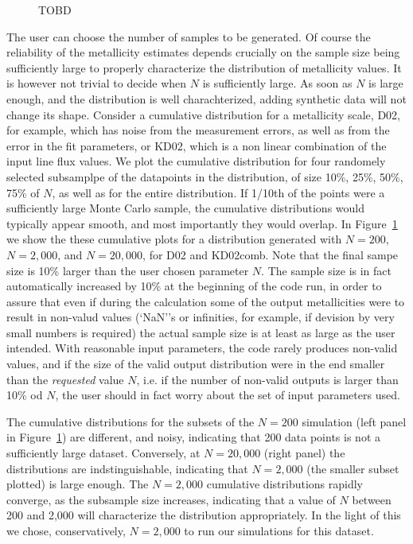 \documentclass{emulateapj}
\begin{document}
\begin{figure}[!ht]
\caption{TOBD}
 \label{cd}
\end{figure}
The user can choose the number of samples to be generated. Of course the reliability of the metallicity estimates depends crucially on the sample size being sufficiently large to properly characterize the distribution of metallicity values. It is however not trivial to decide when $N$ is sufficiently large. As soon as $N$ is large enough, and the distribution is well charachterized, adding synthetic data will not change its shape. Consider a cumulative distribution for a metallicity scale, D02, for example, which has noise from the measurement errors, as well as from the error in the fit parameters, or KD02, which is a non linear combination of the input line flux values. We plot the cumulative distribution for four randomely selected subsamplpe of the datapoints in the distribution, of size 10\%, 25\%, 50\%, 75\% of $N$, as well as for the entire distribution. If 1/10th of the points were a sufficiently large Monte Carlo sample, the cumulative distributions would typically appear smooth, and most importantly they would overlap. In Figure~\ref{cd} we show the these cumulative plots for a distribution generated with $N=200$, $N=2,000$, and $N=20,000$, for D02 and KD02comb. Note that the final sampe size is 10\% larger than the user chosen parameter $N$. The sample size is in fact automatically increased by 10\% at the beginning of the code run, in order to assure that even if during the calculation some of the output metallicities were to result in non-valud values (`NaN''s or infinities, for example, if devision by very small numbers is required) the actual sample size is at least as large as the user intended. With reasonable input parameters, the code rarely produces non-valid values, and if the size of the valid output distribution were in the end smaller than the \emph{requested} value $N$, i.e. if the number of non-valid outputs is larger than 10\% od $N$, the user should in fact worry about the set of input parameters used. 

The cumulative distributions for the subsets of the $N=200$ simulation (left panel in Figure~\ref{cd}) are different, and noisy, indicating that 200 data points is not a sufficiently large dataset. Conversely, at $N=20,000$ (right panel) the distributions are indstinguishable, indicating that $N=2,000$ (the smaller subset plotted) is large enough. The $N=2,000$ cumulative distributions rapidly converge, as the subsample size increases, indicating that a value of $N$  between 200 and 2,000 will characterize the distribution appropriately.  In the light of this we chose, conservatively, $N=2,000$ to run our simulations for this dataset. 
\end{document}
